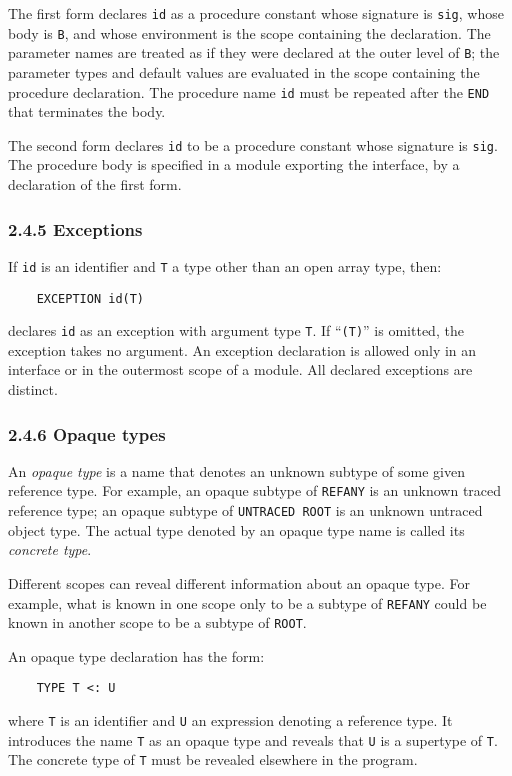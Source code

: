 \documentclass[10pt]{article}
\begin{document}
The first form declares \verb|id| as a procedure constant whose signature is
\verb|sig|, whose body is \verb|B|, and whose environment is the scope
containing the declaration.  The parameter names are treated as if they were
declared at the outer level of \verb|B|; the parameter types and default
values are evaluated in the scope containing the procedure declaration.  The
procedure name \verb|id| must be repeated after the \verb|END| that terminates
the body.

The second form declares \verb|id| to be a procedure constant whose signature
is \verb|sig|.  The procedure body is specified in a module exporting the
interface, by a declaration of the first form.

\subsubsection*{2.4.5 Exceptions}

If \verb|id| is an identifier and \verb|T| a type other than an open array
type, then:
\begin{verbatim}
    EXCEPTION id(T)
\end{verbatim}
declares \verb|id| as an exception with argument type \verb|T|.  If
``\verb|(T)|'' is omitted, the exception takes no argument.  An exception
declaration is allowed only in an interface or in the outermost scope of a
module.  All declared exceptions are distinct.

\subsubsection*{2.4.6 Opaque types}

An \emph{opaque type} is a name that denotes an unknown subtype of some given
reference type.  For example, an opaque subtype of \verb|REFANY| is an unknown
traced reference type; an opaque subtype of \verb|UNTRACED ROOT| is an unknown
untraced object type.  The actual type denoted by an opaque type name is
called its \emph{concrete type}.

Different scopes can reveal different information about an opaque type.  For
example, what is known in one scope only to be a subtype of \verb|REFANY|
could be known in another scope to be a subtype of \verb|ROOT|.

An opaque type declaration has the form:
\begin{verbatim}
    TYPE T <: U
\end{verbatim}
where \verb|T| is an identifier and \verb|U| an expression denoting a
reference type.  It introduces the name \verb|T| as an opaque type and reveals
that \verb|U| is a supertype of \verb|T|.  The concrete type of \verb|T| must
be revealed elsewhere in the program.
\end{document}
